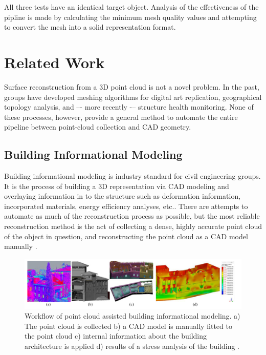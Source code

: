 \documentclass[12pt]{drexelthesis}
\let\Oldsection\section
\renewcommand{\section}{\FloatBarrier\Oldsection}
\let\Oldsubsection\subsection
\renewcommand{\subsection}{\FloatBarrier\Oldsubsection}
\begin{document}
All three tests have an identical target object. Analysis of the effectiveness of the pipline is made by calculating the minimum mesh quality values and attempting to convert the mesh into a solid representation format. 

\section{Related Work}
\label{sec:related}
Surface reconstruction from a 3D point cloud is not a novel problem. In the past, groups have developed meshing algorithms for digital art replication, geographical topology analysis, and –- more recently -– structure health monitoring. None of these processes, however, provide a general method to automate the entire pipeline between point-cloud collection and CAD geometry.




\subsection{Building Informational Modeling}
\label{subsec:BIM}
Building informational modeling is industry standard for civil engineering groups. It is the process of building a 3D representation via CAD modeling and overlaying information in to the structure such as deformation information, incorporated materials, energy efficiency analyses, etc.. There are attempts to automate as much of the reconstruction process as possible, but the most reliable reconstruction method is the act of collecting a dense, highly accurate point cloud of the object in question, and reconstructing the point cloud as a CAD model manually \cite{RN30}.

\begin{figure}
	\centering
	\includegraphics[width=5in]{introduction/bimworkflow.png}
	\caption[Building informational model workflow]{\centering Workflow of point cloud assisted building informational modeling. a) The point cloud is collected b) a CAD model is manually fitted to the point cloud c) internal information about the building architecture is applied d) results of a stress analysis of the building \cite{RN30}.}
\end{figure}
\end{document}
